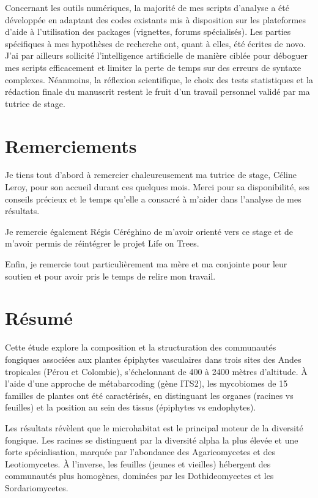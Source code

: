 \documentclass[a4paper,12pt]{article}
\begin{document}
Concernant les outils numériques, la majorité de mes scripts d'analyse a été développée en adaptant des codes existants mis à disposition sur les plateformes d'aide à l'utilisation des packages (vignettes, forums spécialisés). Les parties spécifiques à mes hypothèses de recherche ont, quant à elles, été écrites de novo. J'ai par ailleurs sollicité l'intelligence artificielle de manière ciblée pour déboguer mes scripts efficacement et limiter la perte de temps sur des erreurs de syntaxe complexes. Néanmoins, la réflexion scientifique, le choix des tests statistiques et la rédaction finale du manuscrit restent le fruit d'un travail personnel validé par ma tutrice de stage.

\newpage

\thispagestyle{empty}
\section*{Remerciements}
Je tiens tout d’abord à remercier chaleureusement ma tutrice de stage, Céline Leroy, pour son accueil durant ces quelques mois. Merci pour sa disponibilité, ses conseils précieux et le temps qu’elle a consacré à m’aider dans l'analyse de mes résultats.  

Je remercie également Régis Céréghino de m'avoir orienté vers ce stage et de m'avoir permis de réintégrer le projet Life on Trees. 

Enfin, je remercie tout particulièrement ma mère et ma conjointe pour leur soutien et pour avoir pris le temps de relire mon travail.
\newpage


\thispagestyle{empty}
\renewcommand{\contentsname}{\centerline{Sommaire}}
\tableofcontents
\newpage

\setcounter{page}{1}
\section{Résumé}

Cette étude explore la composition et la structuration des communautés fongiques associées aux plantes épiphytes vasculaires dans trois sites des Andes tropicales (Pérou et Colombie), s'échelonnant de 400 à 2400 mètres d'altitude. À l'aide d'une approche de métabarcoding (gène ITS2), les mycobiomes de 15 familles de plantes ont été caractérisés, en distinguant les organes (racines vs feuilles) et la position au sein des tissus (épiphytes vs endophytes).  

Les résultats révèlent que le microhabitat est le principal moteur de la diversité fongique. Les racines se distinguent par la diversité alpha la plus élevée et une forte spécialisation, marquée par l'abondance des Agaricomycetes et des Leotiomycetes. À l'inverse, les feuilles (jeunes et vieilles) hébergent des communautés plus homogènes, dominées par les Dothideomycetes et les Sordariomycetes.  
\end{document}
